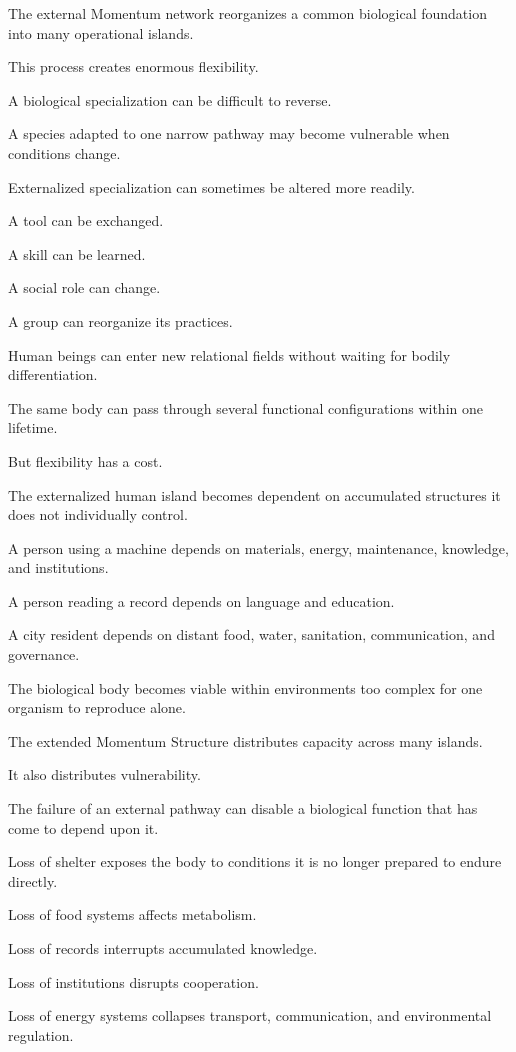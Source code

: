 The external Momentum network reorganizes a common biological foundation into many operational islands.

This process creates enormous flexibility.

A biological specialization can be difficult to reverse.

A species adapted to one narrow pathway may become vulnerable when conditions change.

Externalized specialization can sometimes be altered more readily.

A tool can be exchanged.

A skill can be learned.

A social role can change.

A group can reorganize its practices.

Human beings can enter new relational fields without waiting for bodily differentiation.

The same body can pass through several functional configurations within one lifetime.

But flexibility has a cost.

The externalized human island becomes dependent on accumulated structures it does not individually control.

A person using a machine depends on materials, energy, maintenance, knowledge, and institutions.

A person reading a record depends on language and education.

A city resident depends on distant food, water, sanitation, communication, and governance.

The biological body becomes viable within environments too complex for one organism to reproduce alone.

The extended Momentum Structure distributes capacity across many islands.

It also distributes vulnerability.

The failure of an external pathway can disable a biological function that has come to depend upon it.

Loss of shelter exposes the body to conditions it is no longer prepared to endure directly.

Loss of food systems affects metabolism.

Loss of records interrupts accumulated knowledge.

Loss of institutions disrupts cooperation.

Loss of energy systems collapses transport, communication, and environmental regulation.

